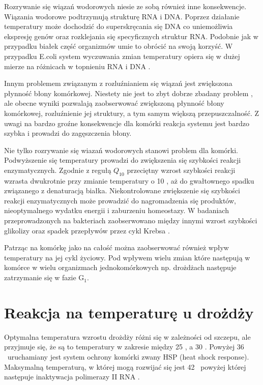\documentclass{pracamgr}
\begin{document}
Rozrywanie się wiązań wodorowych niesie ze sobą również inne konsekwencje. Wiązania wodorowe podtrzymują strukturę RNA i DNA. Poprzez działanie temperatury może dochodzić do superskręcania się DNA co uniemożliwia 
ekspresję genów oraz rozklejania się specyficznych struktur RNA. Podobnie jak w przypadku białek część organizmów umie to obrócić na swoją korzyść. W przypadku E.coli system wyczuwania zmian temperatury opiera się
w dużej mierze na różnicach w topnieniu RNA i DNA \cite{TsInEubact, Digel08}.

Innym problemem związanym z rozluźnianiem się wiązań jest zwiększona płynność błony komórkowej. Niestety nie jest to zbyt dobrze zbadany problem \cite{Membranefluidity}, ale obecne wyniki pozwalają zaobserwować zwiększoną
płynność błony komórkowej, rozluźnienie jej struktury, a tym samym większą przepuszczalność. Z uwagi na bardzo groźne konsekwencje dla komórki reakcja systemu jest bardzo szybka i prowadzi do zagęszczenia błony.

Nie tylko rozrywanie się wiazań wodorowych stanowi problem dla komórki. Podwyższenie się temperatury prowadzi do zwiększenia się szybkości reakcji enzymatycznych. Zgodnie z regułą $Q_{10}$ przeciętny wzrost
szybkości reakcji wzrasta dwukrotnie przy zmianie temperatury o 10 \textcelsius, aż do gwałtownego spadku związanego z denaturacją białka. Niekontrolowane zwiększenie się szybkości reakcji enzymatycznych
może prowadzić do nagromadzenia się produktów, nieoptymalnego wydatku energii i zaburzeniu homeostazy. W badaniach przeprowadzonych na bakteriach zaobserwowano między innymi wzrost szybkości glikolizy oraz spadek przepływów przez 
cykl Krebsa \cite{Wittmann07}.

Patrząc na komórkę jako na całość można zaobserwować również wpływ temperatury na jej cykl życiowy. Pod wpływem wielu zmian które następują w komórce w wielu organizmach jednokomórkowych np. drożdżach 
następuje zatrzymanie się w fazie G$_1$.

\section{Reakcja na temperaturę u drożdży}

Optymalna temperatura wzrostu drożdży różni się w zależności od szczepu, ale przyjmuje się, że są to temperatury w 
zakresie między 25 \textcelsius, a 30 \textcelsius. Powyżej 36 \textcelsius\ uruchamiany jest system ochrony komórki
zwany HSP (heat shock response). Maksymalną temperaturą, w której mogą rozwijać się jest 42 \textcelsius\ powyżej której 
następuje inaktywacja polimerazy II RNA \cite{Morano12}.
\end{document}
